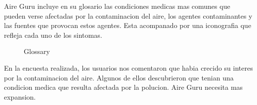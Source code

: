 Aire Guru incluye en su glosario las condiciones medicas mas comunes que pueden verse afectadas por la contaminacion
del aire, los agentes contaminantes y las fuentes que provocan estos agentes. Esta acompanado por una iconografia
que refleja cada uno de los sintomas.\\


 \begin{figure}[ht]
    \centering
    \hfill
  
  \caption{Glossary}
    \end{figure}


\begin{itemize}
    \done En la encuesta realizada, los usuarios nos comentaron que habia crecido su interes por la contaminacion
    del aire. Algunos de ellos descubrieron que tenian una condicion medica que resulta afectada por la polucion.
    \crossed Aire Guru necesita mas expansion.
    
\end{itemize}
\newpage